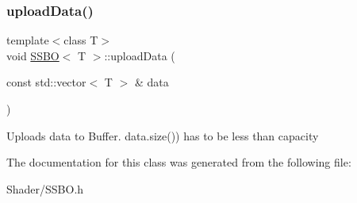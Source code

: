 \subsubsection{\texorpdfstring{uploadData()}{uploadData()}}
{\footnotesize\ttfamily template$<$class T$>$ \\
void \mbox{\hyperlink{class_s_s_b_o}{S\+S\+BO}}$<$ T $>$\+::upload\+Data (\begin{DoxyParamCaption}\item[{const std\+::vector$<$ T $>$ \&}]{data }\end{DoxyParamCaption})}

Uploads data to Buffer. data.\+size()) has to be less than capacity 

The documentation for this class was generated from the following file\+:\begin{DoxyCompactItemize}
\item 
Shader/S\+S\+B\+O.\+h\end{DoxyCompactItemize}
